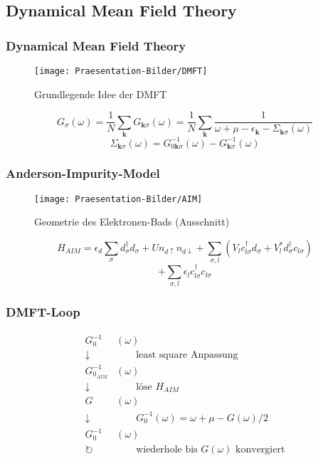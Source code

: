 \documentclass{beamer}
\begin{document}

\subsection[DMFT]{Dynamical Mean Field Theory}
\begin{frame}
\frametitle{Dynamical Mean Field Theory}
\begin{figure}[h!]
	\centering
	\texttt{[image: Praesentation-Bilder/DMFT]}
	\caption{Grundlegende Idee der DMFT \cite{Georges}}
	\label{fig:dmft}
\end{figure}\pause
\[ G_\sigma(\omega) = \frac{1}{N}\sum_{\boldsymbol{k}}G_{\boldsymbol{k}\sigma}(\omega) = \frac{1}{N}\sum_{\boldsymbol{k}} \frac{1}{\omega + \mu - \epsilon_{\boldsymbol{k}} - \Sigma_{\boldsymbol{k}\sigma}(\omega)} \]
\[ \Sigma_{\boldsymbol{k}\sigma}(\omega) = G_{0\boldsymbol{k}\sigma}^{-1}(\omega)- G_{\boldsymbol{k}\sigma}^{-1}(\omega) \]
\end{frame}

\begin{frame}
\frametitle{Anderson-Impurity-Model}
\begin{figure}[h]
	\centering
	\texttt{[image: Praesentation-Bilder/AIM]}
	\caption{Geometrie des Elektronen-Bads \cite{Evertz}(Ausschnitt)}
	\label{fig:aim}
\end{figure}
\[ H_{AIM} = \epsilon_d \sum_{\sigma} d_{\sigma}^\dag d_{\sigma} + Un_{d\uparrow}n_{d\downarrow} + \sum_{\sigma,l}\left( V_l c_{l\sigma}^\dag d_{\sigma} + V_l^* d_{\sigma}^\dag c_{l\sigma}\right) \]
\[ + \sum_{\sigma,l}\epsilon_l c_{l\sigma}^\dag c_{l\sigma} \]
\end{frame}

\begin{frame}
\frametitle{DMFT-Loop}
\begin{align*}
	G_0^{-1}&(\omega)\\
	\downarrow& \qquad \text{least square Anpassung}\\
	G^{-1}_{0_{AIM}}&(\omega)\\
	\downarrow& \qquad \text{löse } H_{AIM}\\
	G&(\omega)\\
	\downarrow& \qquad G_0^{-1}(\omega)=\omega+\mu-G(\omega)/2\\
	G_0^{-1}&(\omega)\\
	\circlearrowright&\qquad \text{wiederhole bis }G(\omega) \text{ konvergiert}
\end{align*}
\end{frame}
\end{document}
